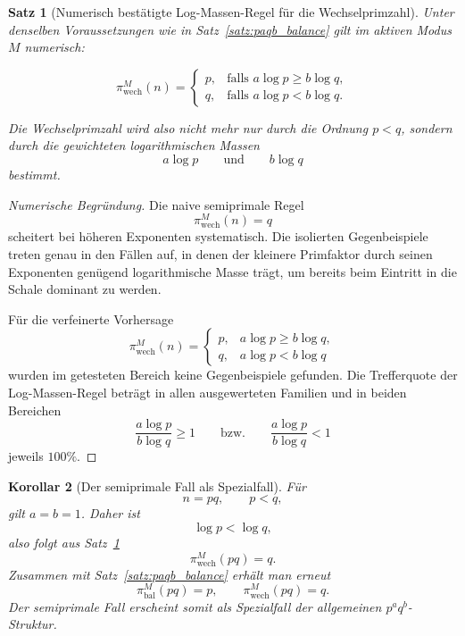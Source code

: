 \documentclass[11pt,a4paper]{article}
\newtheorem{satz}{Satz}
\newtheorem{korollar}[satz]{Korollar}
\theoremstyle{definition}
\theoremstyle{remark}
\begin{document}
	\begin{satz}[Numerisch bestätigte Log-Massen-Regel für die Wechselprimzahl]
		\label{satz:paqb_logmasse}
		Unter denselben Voraussetzungen wie in Satz~\ref{satz:paqb_balance} gilt im aktiven Modus
		\(M\) numerisch:
		
		\[
		\pi_{\mathrm{wech}}^{M}(n)=
		\begin{cases}
			p, & \text{falls } a\log p \ge b\log q,\\[1mm]
			q, & \text{falls } a\log p < b\log q.
		\end{cases}
		\]
		
		Die Wechselprimzahl wird also nicht mehr nur durch die Ordnung \(p<q\), sondern durch die
		gewichteten logarithmischen Massen
		\[
		a\log p
		\qquad\text{und}\qquad
		b\log q
		\]
		bestimmt.
	\end{satz}
	
	\begin{proof}[Numerische Begründung]
		Die naive semiprimale Regel
		\[
		\pi_{\mathrm{wech}}^{M}(n)=q
		\]
		scheitert bei höheren Exponenten systematisch. Die isolierten Gegenbeispiele treten genau
		in den Fällen auf, in denen der kleinere Primfaktor durch seinen Exponenten genügend
		logarithmische Masse trägt, um bereits beim Eintritt in die Schale dominant zu werden.
		
		Für die verfeinerte Vorhersage
		\[
		\pi_{\mathrm{wech}}^{M}(n)=
		\begin{cases}
			p,& a\log p \ge b\log q,\\
			q,& a\log p < b\log q
		\end{cases}
		\]
		wurden im getesteten Bereich keine Gegenbeispiele gefunden. Die Trefferquote der
		Log-Massen-Regel beträgt in allen ausgewerteten Familien und in beiden Bereichen
		\[
		\frac{a\log p}{b\log q}\ge 1
		\qquad\text{bzw.}\qquad
		\frac{a\log p}{b\log q}<1
		\]
		jeweils \(100\%\).
	\end{proof}
	
	\begin{korollar}[Der semiprimale Fall als Spezialfall]
		\label{kor:paqb_semiprime}
		Für
		\[
		n=pq,\qquad p<q,
		\]
		gilt \(a=b=1\). Daher ist
		\[
		\log p<\log q,
		\]
		also folgt aus Satz~\ref{satz:paqb_logmasse}
		\[
		\pi_{\mathrm{wech}}^{M}(pq)=q.
		\]
		Zusammen mit Satz~\ref{satz:paqb_balance} erhält man erneut
		\[
		\pi_{\mathrm{bal}}^{M}(pq)=p,\qquad
		\pi_{\mathrm{wech}}^{M}(pq)=q.
		\]
		Der semiprimale Fall erscheint somit als Spezialfall der allgemeinen \(p^a q^b\)-Struktur.
	\end{korollar}
	
\end{document}
